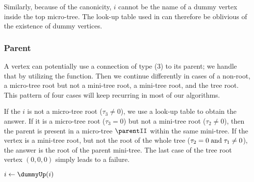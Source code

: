 Similarly, because of the canonicity, $i$ cannot be the name of a dummy vertex inside the top micro-tree.
The \degree{} look-up table used in \isLeaf{} can therefore be oblivious of the existence of dummy vertices.

\begin{algorithm}
\begin{algorithmic}
	\State {}
\EndFunction
\end{algorithmic}
\end{algorithm}

\begin{algorithm}
\begin{algorithmic}
	\State {}
\EndFunction
\end{algorithmic}
\end{algorithm}

\subsubsection{Parent}

A vertex can potentially use a connection of type (3) to its parent; we handle that by utilizing the \dummyUp{} function.
Then we continue differently in cases of a non-root, a micro-tree root but not a mini-tree root, a mini-tree root, and the tree root.
This pattern of four cases will keep recurring in most of our algorithms.

If the $i$ is not a micro-tree root ($\tau_3 \ne 0$), we use a look-up table to obtain the answer.
If it is a micro-tree root ($\tau_3 = 0$) but not a mini-tree root ($\tau_2 \ne 0$), then the parent is present in a micro-tree $\parentII$ within the same mini-tree.
If the vertex is a mini-tree root, but not the root of the whole tree ($\tau_2 = 0 \mathrel{\textrm{and}} \tau_1 \ne 0$), the answer is the root of the parent mini-tree.
The last case of the tree root vertex $(0, 0, 0)$ simply leads to a failure.

\begin{algorithm}
\begin{algorithmic}
	\State $i \gets \dummyUp(i)$ 
	 
		\State {} 
	 
		\State {} 
	 
		\State {}
	\Else {}
		\State {}
	\EndIf
\EndFunction
\end{algorithmic}
\end{algorithm}

